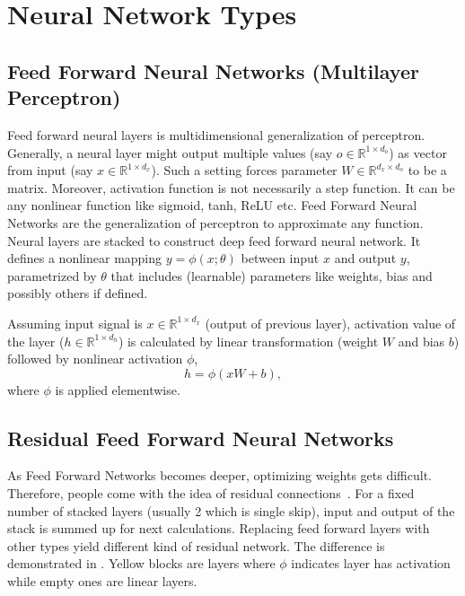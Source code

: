 \section{Neural Network Types}
\label{sec:nnet_types}

\subsection{Feed Forward Neural Networks (Multilayer Perceptron)}

Feed forward neural layers is multidimensional generalization of perceptron. 
Generally, a neural layer might output multiple values (say $o \in \mathbb{R}^{1 \times d_o}$) as vector from input (say $x \in \mathbb{R}^{1 \times d_x}$). 
Such a setting forces parameter $W \in \mathbb{R}^{d_x \times d_o} $ to be a matrix. 
Moreover, activation function is not necessarily a step function. 
It can be any nonlinear function like sigmoid, tanh, ReLU etc. 
Feed Forward Neural Networks are the generalization of perceptron to approximate any function. 
Neural layers are stacked to construct deep feed forward neural network. 
It defines a nonlinear mapping $y=\phi(x;\theta)$ between input $x$ and output $y$, parametrized by $\theta$ that includes (learnable) parameters like weights, bias and possibly others if defined.

Assuming input signal is $x \in \mathbb{R}^{1 \times d_x}$ (output of previous layer), 
activation value of the layer ($h \in \mathbb{R}^{1 \times d_h}$) is calculated by linear transformation (weight $W$ and bias $b$) followed by nonlinear activation $\phi$, 
\begin{equation}
\label{eqn:mlpact}
h = \phi(x W + b),
\end{equation}
where $\phi$ is applied elementwise.

\subsection{Residual Feed Forward Neural Networks}

As Feed Forward Networks becomes deeper, optimizing weights gets difficult. 
Therefore, people come with the idea of residual connections~\cite{he_deep_2015}. 
For a fixed number of stacked layers (usually 2 which is single skip), input and output of the stack is summed up for next calculations. 
Replacing feed forward layers with other types yield different kind of residual network. 
The difference is demonstrated in . 
Yellow blocks are layers where $\phi$ indicates layer has activation while empty ones are linear layers.


